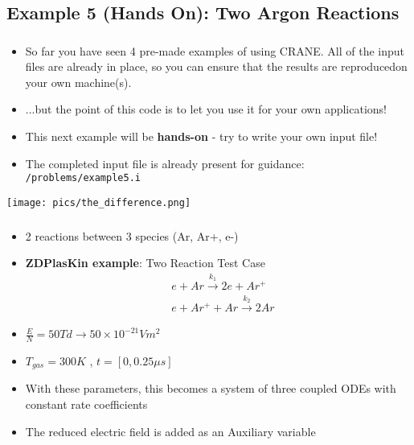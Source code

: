 \subsection{Example 5 (Hands On): Two Argon Reactions}

\begin{frame}[fragile]
	\frametitle{\insertsubsectionhead}
	\begin{minipage}{0.6\linewidth}
	\begin{itemize}
		\item So far you have seen 4 pre-made examples of using CRANE. All of the input files are already in place, so you can ensure that the results are reproduced\footnotemark on your own machine(s).
		\item ...but the point of this code is to let you use it for your own applications!
		\item This next example will be \textbf{hands-on} - try to write your own input file!
		\item The completed input file is already present for guidance: \texttt{/problems/example5.i}
	\end{itemize}
	\end{minipage}%
	\begin{minipage}{0.4\linewidth}
		\texttt{[image: pics/the\_difference.png]}
	\end{minipage}
\end{frame}

\begin{frame}[fragile]
	\frametitle{\insertsubsectionhead}
	\begin{itemize}
		\item 2 reactions between 3 species (Ar, Ar+, e-)
		\item \textbf{ZDPlasKin example}\footnotemark: Two Reaction Test Case 
		\begin{align*}
			&e + Ar \xrightarrow{k_1} 2e + Ar^+  \\
			&e + Ar^+ + Ar \xrightarrow{k_2} 2Ar  
		\end{align*}
		\item $\tfrac{E}{N} = 50 Td \rightarrow 50\times 10^{-21} V m^2$
		\item $T_{gas} = 300 K$ , $t=[0,0.25 \mu s]$
		\item With these parameters, this becomes a system of three coupled ODEs with constant rate coefficients
		\item The reduced electric field is added as an Auxiliary variable

	\end{itemize}
\end{frame}

